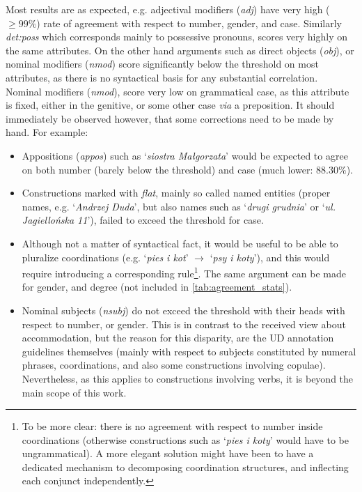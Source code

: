 \documentclass[12pt]{article}
\newcommand{\inlinegloss}[1]{`\textit{#1}'}
\begin{document}
Most results are as expected, e.g. adjectival modifiers (\textit{adj}) have very high ($\geq99\%$) rate of agreement with respect to number, gender, and case. Similarly \textit{det:poss} which corresponds mainly to possessive pronouns, scores very highly on the same attributes. On the other hand arguments such as direct objects (\textit{obj}), or nominal modifiers (\textit{nmod}) score significantly below the threshold on most attributes, as there is no syntactical basis for any substantial correlation. Nominal modifiers (\textit{nmod}), score very low on grammatical case, as this attribute is fixed, either in the genitive, or some other case \textit{via} a preposition. It should immediately be observed however, that some corrections need to be made by hand. For example:
\begin{itemize}
\item Appositions (\textit{appos}) such as \inlinegloss{siostra Małgorzata} would be expected to agree on both number (barely below the threshold) and case (much lower: $88.30\%$).
\item Constructions marked with \textit{flat}, mainly so called named entities (proper names, e.g. \inlinegloss{Andrzej Duda}, but also names such as \inlinegloss{drugi grudnia} or \inlinegloss{ul. Jagiellońska 11}), failed to exceed the threshold for case.
\item Although not a matter of syntactical fact, it would be useful to be able to pluralize coordinations (e.g. \inlinegloss{pies i kot} $\rightarrow$ \inlinegloss{psy i koty}), and this would require introducing a corresponding rule\footnote{To be more clear: there is no agreement with respect to number inside coordinations (otherwise constructions such as \inlinegloss{pies i koty} would have to be ungrammatical). A more elegant solution might have been to have a dedicated mechanism to decomposing coordination structures, and inflecting each conjunct independently.}. The same argument can be made for gender, and degree (not included in \autoref{tab:agreement_stats}).
\item Nominal subjects (\textit{nsubj}) do not exceed the threshold with their heads with respect to number, or gender. This is in contrast to the received view about accommodation, but the reason for this disparity, are the UD annotation guidelines themselves (mainly with respect to subjects constituted by numeral phrases, coordinations, and also some constructions involving copulae). Nevertheless, as this applies to constructions involving verbs, it is beyond the main scope of this work.
\end{itemize}
\end{document}
